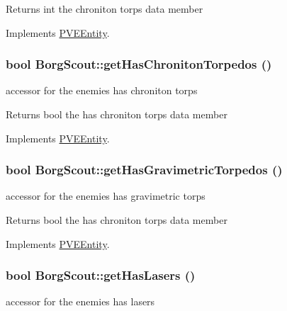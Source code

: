 \begin{DoxyReturn}{Returns}
int the chroniton torps data member 
\end{DoxyReturn}


Implements \hyperlink{classPVEEntity}{PVEEntity}.

\hypertarget{classBorgScout_a2fe05bd1706ab0f55a8bb3075ab97ca0}{
\subsubsection[{getHasChronitonTorpedos}]{\setlength{\rightskip}{0pt plus 5cm}bool BorgScout::getHasChronitonTorpedos ()}}
\label{d5/d8c/classBorgScout_a2fe05bd1706ab0f55a8bb3075ab97ca0}
accessor for the enemies has chroniton torps

\begin{DoxyReturn}{Returns}
bool the has chroniton torps data member 
\end{DoxyReturn}


Implements \hyperlink{classPVEEntity}{PVEEntity}.

\hypertarget{classBorgScout_af9589d7333a7f56aadcd49ebfdb63453}{
\subsubsection[{getHasGravimetricTorpedos}]{\setlength{\rightskip}{0pt plus 5cm}bool BorgScout::getHasGravimetricTorpedos ()}}
\label{d5/d8c/classBorgScout_af9589d7333a7f56aadcd49ebfdb63453}
accessor for the enemies has gravimetric torps

\begin{DoxyReturn}{Returns}
bool the has chroniton torps data member 
\end{DoxyReturn}


Implements \hyperlink{classPVEEntity}{PVEEntity}.

\hypertarget{classBorgScout_a685ff7acbc0f6987cb62a617853f96f7}{
\subsubsection[{getHasLasers}]{\setlength{\rightskip}{0pt plus 5cm}bool BorgScout::getHasLasers ()}}
\label{d5/d8c/classBorgScout_a685ff7acbc0f6987cb62a617853f96f7}
accessor for the enemies has lasers

